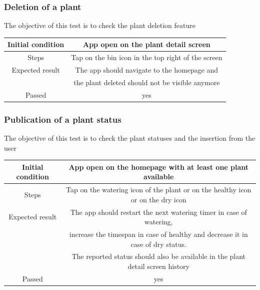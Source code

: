 \documentclass[10pt]{article}
\begin{document}
	\subsubsection{Deletion of a plant}
	The objective of this test is to check the plant deletion feature
	\begin{center}
		\begin{tabular}{ |c|c| } 
			\hline
			Initial condition & App open on the plant detail screen\\
			\hline
			Steps & Tap on the bin icon in the top right of the screen\\
			\hline
			Expected result & The app should navigate to the homepage and\\
			& the plant deleted should not be visible anymore\\
			\hline
			Passed & yes\\
			\hline
		\end{tabular}
	\end{center}
	\subsubsection{Publication of a plant status}
	The objective of this test is to check the plant statuses and the insertion from the user
	\begin{center}
		\begin{tabular}{ |c|c| } 
			\hline
			Initial condition & App open on the homepage with at least one plant available\\
			\hline
			Steps & Tap on the watering icon of the plant or on the healthy icon or on the dry icon\\
			\hline
			Expected result & The app should restart the next watering timer in case of watering,\\ & increase the timespan in case of healthy and decrease it in case of dry status.\\
			& The reported status should also be available in the plant detail screen history\\
			\hline
			Passed & yes\\
			\hline
		\end{tabular}
	\end{center}
	
\end{document}
